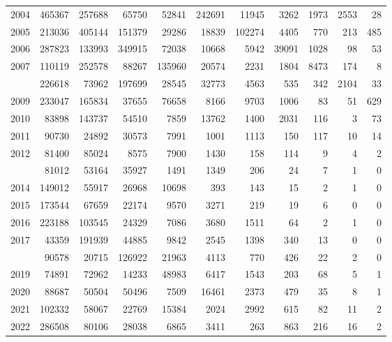 \documentclass[
]{article}
\begin{document}
\begin{longtable}[t]{lrrrrrrrrrr}
2004 & 465367 & 257688 & 65750 & 52841 & 242691 & 11945 & 3262 & 1973 & 2553 & 28\\
2005 & 213036 & 405144 & 151379 & 29286 & 18839 & 102274 & 4405 & 770 & 213 & 485\\
2006 & 287823 & 133993 & 349915 & 72038 & 10668 & 5942 & 39091 & 1028 & 98 & 53\\
2007 & 110119 & 252578 & 88267 & 135960 & 20574 & 2231 & 1804 & 8473 & 174 & 8\\
\addlinespace
2008 & 226618 & 73962 & 197699 & 28545 & 32773 & 4563 & 535 & 342 & 2104 & 33\\
2009 & 233047 & 165834 & 37655 & 76658 & 8166 & 9703 & 1006 & 83 & 51 & 629\\
2010 & 83898 & 143737 & 54510 & 7859 & 13762 & 1400 & 2031 & 116 & 3 & 73\\
2011 & 90730 & 24892 & 30573 & 7991 & 1001 & 1113 & 150 & 117 & 10 & 14\\
2012 & 81400 & 85024 & 8575 & 7900 & 1430 & 158 & 114 & 9 & 4 & 2\\
\addlinespace
2013 & 81012 & 53164 & 35927 & 1491 & 1349 & 206 & 24 & 7 & 1 & 0\\
2014 & 149012 & 55917 & 26968 & 10698 & 393 & 143 & 15 & 2 & 1 & 0\\
2015 & 173544 & 67659 & 22174 & 9570 & 3271 & 219 & 19 & 6 & 0 & 0\\
2016 & 223188 & 103545 & 24329 & 7086 & 3680 & 1511 & 64 & 2 & 1 & 0\\
2017 & 43359 & 191939 & 44885 & 9842 & 2545 & 1398 & 340 & 13 & 0 & 0\\
\addlinespace
2018 & 90578 & 20715 & 126922 & 21963 & 4113 & 770 & 426 & 22 & 2 & 0\\
2019 & 74891 & 72962 & 14233 & 48983 & 6417 & 1543 & 203 & 68 & 5 & 1\\
2020 & 88687 & 50504 & 50496 & 7509 & 16461 & 2373 & 479 & 35 & 8 & 1\\
2021 & 102332 & 58067 & 22769 & 15384 & 2024 & 2992 & 615 & 82 & 11 & 2\\
2022 & 286508 & 80106 & 28038 & 6865 & 3411 & 263 & 863 & 216 & 16 & 2\\*
\end{longtable}
\end{document}
